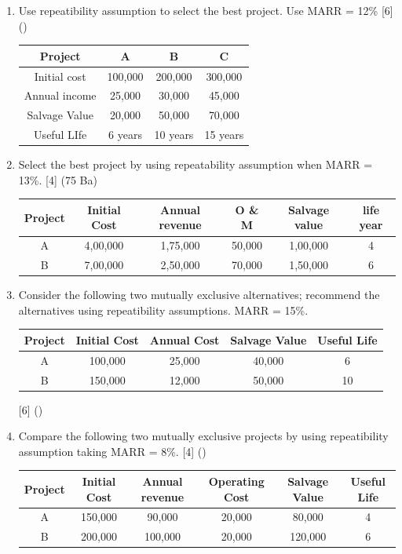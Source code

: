 \documentclass[12pt]{article}
\begin{document}
\begin{enumerate}
				\item Use repeatibility assumption to select the best project. Use MARR = 12\% \hfill [6] ()\\
				\begin{tabular}{|c|c|c|c|}
					\hline
					Project & A & B & C \\ \hline
					Initial cost & 100,000 & 200,000 & 300,000 \\ \hline
					Annual income & 25,000 & 30,000 & 45,000 \\ \hline
					Salvage Value & 20,000 & 50,000 & 70,000 \\ \hline
					Useful LIfe & 6 years & 10 years & 15 years \\ \hline
				\end{tabular}
				
				\item Select the best project by using repeatability assumption when MARR = 13\%. \hfill [4] (75 Ba)
				\begin{tabular}{|c|c|c|c|c|c|}
					\hline
					Project & Initial Cost & Annual revenue & O \& M & Salvage value & life year\\ \hline
					A & 4,00,000 & 1,75,000 & 50,000 & 1,00,000 & 4 \\ \hline
					B & 7,00,000 & 2,50,000 & 70,000 & 1,50,000 & 6 \\ \hline
				\end{tabular}
				
				\item Consider the following two mutually exclusive alternatives; recommend the alternatives using repeatibility assumptions. MARR = 15\%.\\
				\begin{tabular}{|c|c|c|c|c|}
					\hline
					Project & Initial Cost & Annual Cost & Salvage Value & Useful Life \\ \hline
					A & 100,000 & 25,000 & 40,000 & 6 \\ \hline
					B & 150,000 & 12,000 & 50,000 & 10 \\ \hline
				\end{tabular} \hfill [6] ()
				
				\item Compare the following two mutually exclusive projects by using repeatibility assumption taking MARR = 8\%. \hfill [4] () \\
				\begin{tabular}{|c|c|c|c|c|c|}
					\hline
					Project & Initial Cost & Annual revenue & Operating Cost & Salvage Value & Useful Life \\ \hline
					A & 150,000 & 90,000 & 20,000 & 80,000 & 4 \\ \hline
					B & 200,000 & 100,000 & 20,000 & 120,000 & 6 \\ \hline
				\end{tabular}
				

\end{enumerate}
\end{document}
